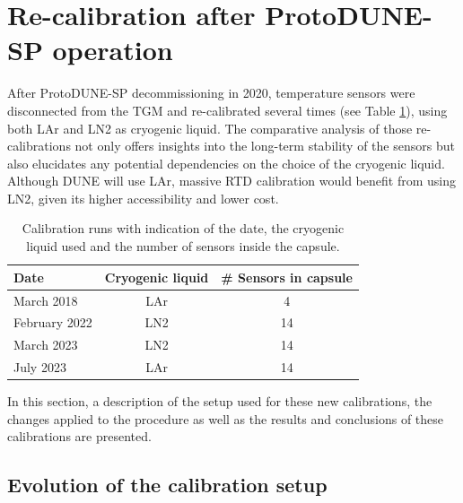 \section{Re-calibration after ProtoDUNE-SP operation}
\label{sec:new_calib}

\noindent After ProtoDUNE-SP decommissioning in 2020, temperature sensors were disconnected from the TGM and re-calibrated several times (see Table \ref{tab:calib}), using both LAr and LN2 as cryogenic liquid. The comparative analysis of those re-calibrations not only offers insights into the long-term stability of the sensors but also elucidates any potential dependencies on the choice of the cryogenic liquid. Although DUNE will use LAr, massive RTD calibration would benefit from using LN2, given its higher accessibility and lower cost.

\begin{table}[htbp]
\begin{center}
\begin{tabular}{l c c}
Date & Cryogenic liquid & \# Sensors in capsule  \\ \hline
March 2018     &   LAr    &  4  \\
February 2022  &   LN2    & 14  \\
March 2023     &   LN2    & 14  \\
July 2023      &   LAr    & 14  \\
\end{tabular}
\end{center}
\caption{Calibration runs with indication of the date, the cryogenic liquid used and the number of sensors inside the capsule.}
\label{tab:calib}
\end{table}

In this section, a description of the setup used for these new calibrations, the changes applied to the procedure as well as the results and conclusions of these calibrations are presented.

\subsection{Evolution of the calibration setup}
\label{sec:new_calib_setup}

